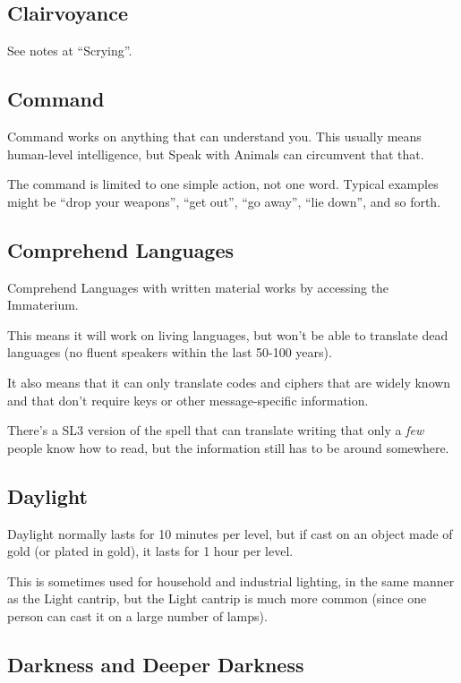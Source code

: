 %
\subsection{Clairvoyance}

See notes at ``Scrying''.
%

%
\subsection{Command}

Command works on anything that can understand you. This usually means
human-level intelligence, but Speak with Animals can circumvent that that.

The command is limited to one simple action, not one word. Typical
examples might be ``drop your weapons'', ``get out'', ``go away'',
``lie down'', and so forth.
%

%
\subsection{Comprehend Languages}

Comprehend Languages with written material works by accessing the
Immaterium.

This means it will work on living languages, but won't be able to translate
dead languages (no fluent speakers within the last 50-100 years).

It also means that it can only translate codes and ciphers that are widely
known and that don't require keys or other message-specific information.

There's a SL3 version of the spell that can translate writing that only a
\textit{few} people know how to read, but the information still has to be
around somewhere.
%

%
\subsection{Daylight}

Daylight normally lasts for 10 minutes per level, but if cast on an object
made of gold (or plated in gold), it lasts for 1 hour per level.

This is sometimes used for household and industrial lighting, in the same
manner as the Light cantrip, but the Light cantrip is much more common
(since one person can cast it on a large number of lamps).
%

%
\subsection{Darkness and Deeper Darkness}

